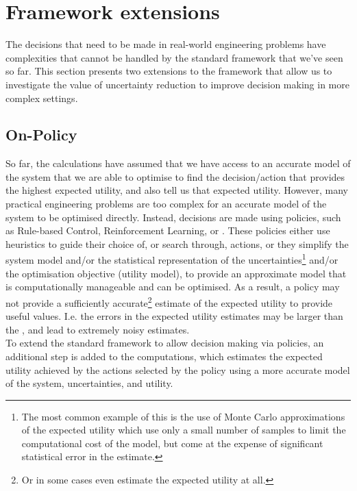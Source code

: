 \section{Framework extensions} \label{sec:methodology-framework-extensions}

The decisions that need to be made in real-world engineering problems have complexities that cannot be handled by the standard  framework that we've seen so far. This section presents two extensions to the framework that allow us to investigate the value of uncertainty reduction to improve decision making in more complex settings.

\subsection{On-Policy } \label{sec:methodology-on-policy-voi}

So far, the  calculations have assumed that we have access to an accurate model of the system that we are able to optimise to find the decision/action that provides the highest expected utility, and also tell us that expected utility. However, many practical engineering problems are too complex for an accurate model of the system to be optimised directly. Instead, decisions are made using policies, such as Rule-based Control, Reinforcement Learning, or . These policies either use heuristics to guide their choice of, or search through, actions, or they simplify the system model and/or the statistical representation of the uncertainties\footnote{The most common example of this is the use of Monte Carlo approximations of the expected utility which use only a small number of samples to limit the computational cost of the model, but come at the expense of significant statistical error in the estimate.} and/or the optimisation objective (utility model), to provide an approximate model that is computationally manageable and can be optimised. As a result, a policy may not provide a sufficiently accurate\footnote{Or in some cases even estimate the expected utility at all.} estimate of the expected utility to provide useful  values. I.e. the errors in the expected utility estimates may be larger than the , and lead to extremely noisy  estimates.\\

To extend the standard  framework to allow decision making via policies, an additional step is added to the computations, which estimates the expected utility achieved by the actions selected by the policy using a more accurate model of the system, uncertainties, and utility.

